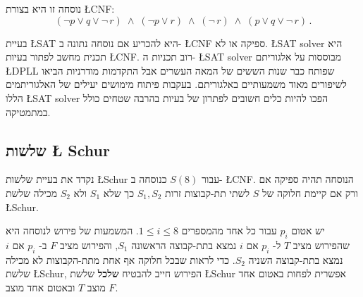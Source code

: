 נוסחה זו היא בצורת
\L{CNF}:
\[
(\neg p \vee q \vee \neg \,r) \;\wedge\; (\neg p \vee r)
\;\wedge\; (\neg \,r)\;\wedge\;(p \vee q \vee \neg \,r)\,.
\]

בעיית
\L{SAT}
היא להכריע אם נוסחה נתונה ב-%
\L{CNF}
ספיקה או לא. 
\L{SAT solver}
היא תכנית מחשב לפתור בעיות
\L{CNF}.
רוב תכניות ה-%
\L{SAT solver}
מבוססות על אלגוריתם
\L{DPLL}
שפותח כבר שנות הששים של המאה העשרים אבל התקדמות מודרניות הביאו לשיפורים מאוד משמעותיים באלגוריתם. בעקבות פיתוח מימושים יעילים של האלגוריתמים הללו 
\L{SAT solver}
הפכו להיות כלים חשובים לפתרון של בעיות בהרבה שטחים כולל במתמטיקה.

\subsection{שלשות \L{ Schur}}

נקדד את בעיית שלשות
\L{Schur}
עבור 
$S(8)$
כנוסחה ב-%
\L{CNF}.
הנוסחה תהיה ספיקה אם ורק אם קיימת חלוקה של 
$S$
לשתי תת-קבוצות זרות
$S_1,S_2$
כך שלא 
$S_1$
ולא
$S_2$
מכילה שלשת
\L{Schur}.

יש אטום
$p_i$
עבור כל אחד מהמספרים
$1\leq i \leq 8$.
המשמעות של פירוש לנוסחה היא שהפירוש מציב
$T$
ל-%
$p_i$
אם
$i$
נמצא בתת-קבוצה הראשונה 
$S_1$,
והפירוש מציב 
$F$
ב-%
$p_i$
אם 
$i$
נמצא בתת-קבוצה השניה
$S_2$.
כדי לראות שבכל חלוקה אף אחת מתת-הקבוצות לא מכילה שלשת
\L{Schur},
הפירוש חייב להבטיח 
\textbf{שלכל}
שלשת
\L{Schur}
אפשרית לפחות באטום אחד מוצב
$T$
ובאטום אחד מוצב
$F$. 

